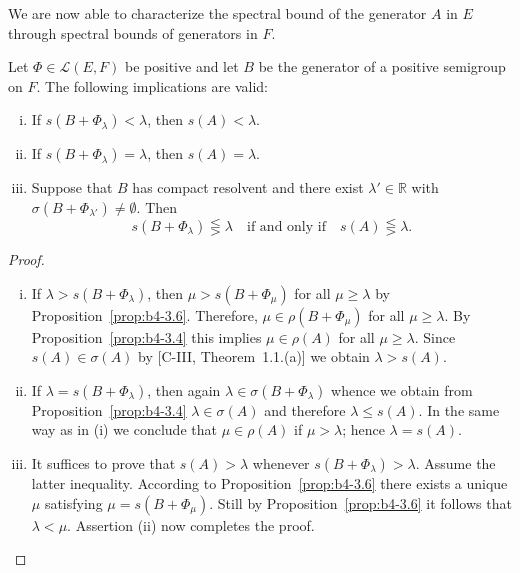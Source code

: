 We are now able to characterize the spectral bound of the generator $A$ in $E$ through spectral bounds of generators in $F$.
%
%
%
%
\newpage
%
%
\begin{theorem}\label{thm:b4-3.7}
	Let $\Phi \in \mathcal{L}(E,F)$ be positive and let $B$ be the generator of a positive semigroup on $F$. 
	The following implications are valid:
	\begin{enumerate}[(i)]
		\item If $s(B + \Phi_{\lambda}) < \lambda$, then $s(A) < \lambda$.
		\item If $s(B + \Phi_{\lambda}) = \lambda$, then $s(A) = \lambda$.
		\item Suppose that $B$ has compact resolvent and there exist $\lambda' \in \mathbb{R}$ with $\sigma(B + \Phi_{\lambda'}) \neq \emptyset$. 
		Then
		\begin{equation}\label{eq:b4-3.6}
		s(B + \Phi_{\lambda}) \lesseqgtr \lambda \quad \text{if and only if} \quad s(A) \lesseqgtr \lambda.
		\end{equation}
	\end{enumerate}
\end{theorem}

\begin{proof}
	\begin{enumerate}[(i), wide]
	\item 
	If $\lambda > s(B + \Phi_{\lambda})$, then $\mu > s(B + \Phi_{\mu})$ for all $\mu \geq \lambda$ by Proposition~\ref{prop:b4-3.6}.  
	Therefore, $\mu \in \rho(B + \Phi_{\mu})$ for all $\mu \geq \lambda$. 
	By Proposition~\ref{prop:b4-3.4} this implies $\mu \in \rho(A)$ for all $\mu \geq \lambda$. 
	Since $s(A) \in \sigma(A)$ by [C-III, Theorem~1.1.(a)] we obtain $\lambda > s(A)$.
	\item 
	If $\lambda = s(B + \Phi_{\lambda})$, then again $\lambda \in \sigma(B + \Phi_{\lambda})$ whence we obtain from Proposition~\ref{prop:b4-3.4} $\lambda \in \sigma(A)$ and therefore $\lambda \leq s(A)$. 
	In the same way as in (i) we conclude that $\mu \in \rho(A)$ if $\mu > \lambda$; hence $\lambda = s(A)$.
	
	\item 
	It suffices to prove that $s(A) > \lambda$ whenever $s(B + \Phi_{\lambda}) > \lambda$. 
	Assume the latter inequality. 
	According to Proposition~\ref{prop:b4-3.6} there exists a unique $\mu$ satisfying $\mu = s(B + \Phi_{\mu})$. 
	Still by Proposition~\ref{prop:b4-3.6} it follows that $\lambda < \mu$. 
	Assertion (ii) now completes the proof.
	\end{enumerate}
\end{proof}

